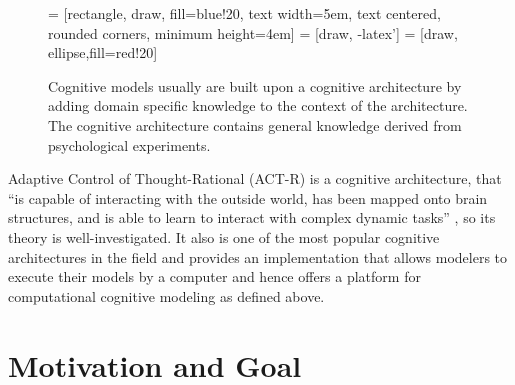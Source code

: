 \begin{figure}[hbt]
\centering
 = [rectangle, draw, fill=blue!20, 
    text width=5em, text centered, rounded corners, minimum height=4em]
 = [draw, -latex']
 = [draw, ellipse,fill=red!20]
    
\caption{Cognitive models usually are built upon a cognitive architecture by adding domain specific knowledge to the context of the architecture. The cognitive architecture contains general knowledge derived from psychological experiments. \cite{about_actr_homepage}}
\label{fig:cognitive_models_architecture}
\end{figure}

Adaptive Control of Thought-Rational  (ACT-R) is a cognitive architecture, that ``is capable of interacting with the outside world, has been mapped onto brain structures, and is able to learn to interact with complex dynamic tasks'' \cite[29]{taatgen_modeling_2006}, so its theory is well-investigated. It also is one of the most popular cognitive architectures in the field \cite{rutledge2005can} and provides an implementation that allows modelers to execute their models by a computer and hence offers a platform for computational cognitive modeling as defined above.

\section{Motivation and Goal}

